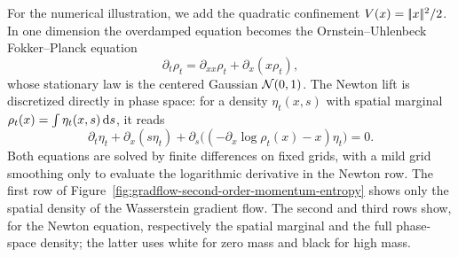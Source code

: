 For the numerical illustration, we add the quadratic confinement $V(x)=|\!| x |\!|^2/2$. In one dimension the overdamped equation becomes the Ornstein--Uhlenbeck Fokker--Planck equation
\[
\partial_t\rho_t=\partial_{xx}\rho_t+\partial_x(x\rho_t),
\]
whose stationary law is the centered Gaussian $\mathcal{N}(0,1)$. The Newton lift is discretized directly in phase space: for a density $\eta_t(x,s)$ with spatial marginal $\rho_t(x)=\int\eta_t(x,s)\,\mathrm{d} s$, it reads
\[
\partial_t\eta_t+\partial_x(s\eta_t)+\partial_s\bigl((-\partial_x\log\rho_t(x)-x)\eta_t\bigr)=0.
\]
Both equations are solved by finite differences on fixed grids, with a mild grid smoothing only to evaluate the logarithmic derivative in the Newton row. The first row of Figure~\ref{fig:gradflow-second-order-momentum-entropy} shows only the spatial density of the Wasserstein gradient flow. The second and third rows show, for the Newton equation, respectively the spatial marginal and the full phase-space density; the latter uses white for zero mass and black for high mass.

